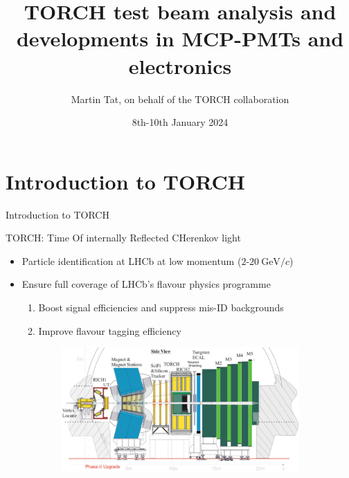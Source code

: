 \documentclass[xcolor={dvipsnames}]{beamer}
\title[LHCb-UK RAL]{TORCH test beam analysis and developments in MCP-PMTs and electronics}
\author[Martin Tat]{Martin Tat, on behalf of the TORCH collaboration}
\institute[University of Oxford]{\normalsize LHCb-UK annual meeting, RAL}
\date{8th-10th January 2024}
\begin{document}
\begin{frame}
  \titlepage
\end{frame}


\section{Introduction to TORCH}
\begin{frame}{Introduction to TORCH}
  \vspace{0.0cm}
  \begin{center}
    {\large TORCH: Time Of internally Reflected CHerenkov light}
  \end{center}
  \begin{itemize}
    \setlength\itemsep{0.3em}
    \item{Particle identification at LHCb at low momentum ($2$-$\SI{20}{\giga\eV/c}$)}
    \item{Ensure full coverage of LHCb's flavour physics programme}
    \begin{enumerate}
      \setlength\itemsep{0.3em}
      \item{Boost signal efficiencies and suppress mis-ID backgrounds}
      \item{Improve flavour tagging efficiency}
    \end{enumerate}
  \end{itemize}
  \begin{figure}
    \centering
    \begin{subfigure}{0.57\textwidth}
      \centering
      \includegraphics[width = 1.0\textwidth]{Figs/TORCH_location.png}
    \end{subfigure}%

\end{figure}
\end{frame}
\end{document}
